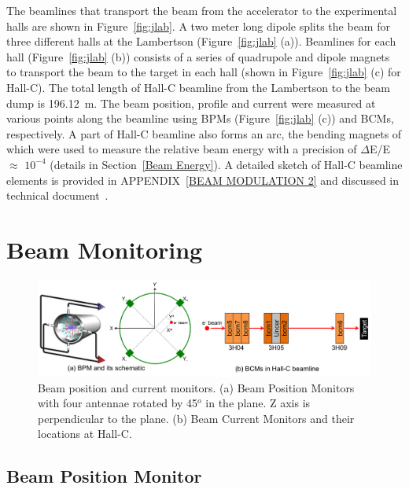 The beamlines that transport the beam from the accelerator to the experimental halls are shown in Figure~\ref{fig:jlab}. A two meter long dipole splits the beam for three different halls at the Lambertson (Figure~\ref{fig:jlab} (a)). Beamlines for each hall (Figure~\ref{fig:jlab} (b)) consists of a series of quadrupole and dipole magnets to transport the beam to the target in each hall (shown in Figure~\ref{fig:jlab} (c) for Hall-C). The total length of Hall-C beamline from the Lambertson to the beam dump is 196.12~m.
The beam position, profile and current were measured at various points along the beamline using BPMs (Figure~\ref{fig:jlab} (c)) and BCMs, respectively. A part of Hall-C beamline also forms an arc, the bending magnets of which were used to measure the relative beam energy with a precision of $\Delta$E/E $\approx$ $10^{-4}$ (details in Section~\ref{Beam Energy}).
A detailed sketch of Hall-C beamline elements is provided in APPENDIX~\ref{BEAM MODULATION 2} and discussed in technical document~\cite{nur_beamline_sketch}.

\section{Beam Monitoring}%
\label{Beam Monitoring}

\begin{singlespace}
\begin{figure}[!h]
	\begin{center}
	\includegraphics[width=15.0cm]{figures/beam_monitor}
	\end{center}
	\caption
	{Beam position and current monitors. (a) Beam Position Monitors with four antennae rotated by 45$^o$ in the plane. Z axis is perpendicular to the plane. (b) Beam Current Monitors and their locations at Hall-C.}
	\label{fig:beam_monitor}
\end{figure}
\end{singlespace}

\subsection{Beam Position Monitor}%
\label{Beam Position Monitor}

